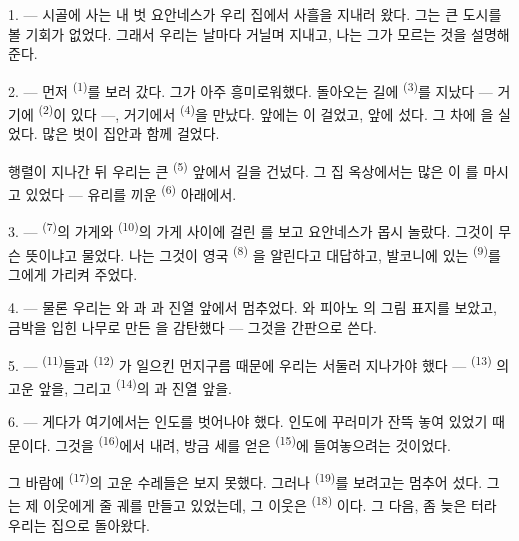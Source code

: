 1. --- 시골에 사는 내 벗 요안네스가 우리 집에서 사흘을 지내러 왔다. 
그는 큰 도시를 볼 기회가 없었다. 그래서 우리는 날마다 거닐며 지내고, 나는 그가 모르는
것을 설명해 준다.

2. --- 먼저  \textsuperscript{(1)}를 보러 갔다. 그가 아주 흥미로워했다.
돌아오는 길에  \textsuperscript{(3)}를 지났다 — 거기에 
\textsuperscript{(2)}이 있다 —, 거기에서  \textsuperscript{(4)}을 만났다.
 앞에는 이 걸었고,  앞에 섰다. 그
차에 을 실었다. 많은 벗이  집안과 함께 걸었다.

행렬이 지나간 뒤 우리는 큰  \textsuperscript{(5)} 앞에서 길을 건넜다. 그
집 옥상에서는 많은 이 를 마시고 있었다 — 유리를 끼운
 \textsuperscript{(6)} 아래에서.

3. ---  \textsuperscript{(7)}의 가게와 
\textsuperscript{(10)}의 가게 사이에 걸린 를 보고 요안네스가 몹시
놀랐다. 그것이 무슨 뜻이냐고 물었다. 나는 그것이 영국  \textsuperscript{(8)}
을 알린다고 대답하고, 발코니에 있는  \textsuperscript{(9)}를 그에게 가리켜
주었다.

\VUsaut{3.0mm}

4. --- 물론 우리는 와 과 과
 진열 앞에서 멈추었다. 와 피아노 의 그림 표지를
보았고, 금박을 입힌 나무로 만든 을 감탄했다 — 그것을 간판으로 쓴다.

5. ---  \textsuperscript{(11)}들과  \textsuperscript{(12)}
가 일으킨 먼지구름 때문에 우리는 서둘러 지나가야 했다 —  \textsuperscript{(13)}
의 고운  앞을, 그리고  \textsuperscript{(14)}의 과
 진열 앞을.

6. --- 게다가 여기에서는 인도를 벗어나야 했다. 인도에 꾸러미가 잔뜩 놓여 있었기
때문이다. 그것을  \textsuperscript{(16)}에서 내려, 방금 세를 얻은
 \textsuperscript{(15)}에 들여놓으려는 것이었다.

그 바람에  \textsuperscript{(17)}의 고운 수레들은 보지 못했다.
그러나  \textsuperscript{(19)}를 보려고는 멈추어 섰다. 그는 제
이웃에게 줄 궤를 만들고 있었는데, 그 이웃은  \textsuperscript{(18)}
이다. 그 다음, 좀 늦은 터라 우리는 집으로 돌아왔다.


